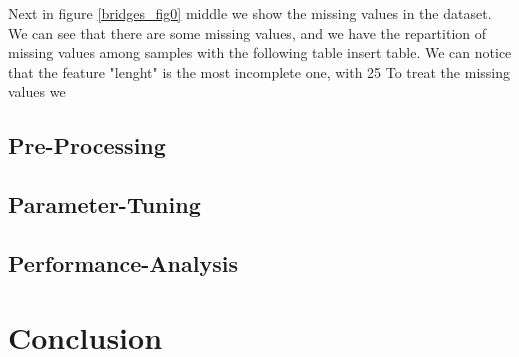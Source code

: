 \documentclass[11pt]{article}
\begin{document}
Next in figure \ref{bridges_fig0} middle we show the missing values in the dataset. We can see that there are some missing values, and we have the repartition of missing values among samples with the following table {insert table}. We can notice that the feature "lenght" is the most incomplete one, with 25%
To treat the missing values we 
\subsection{Pre-Processing}
\subsection{Parameter-Tuning}
\subsection{Performance-Analysis}

\section{Conclusion}

\newpage
 

\end{document}
